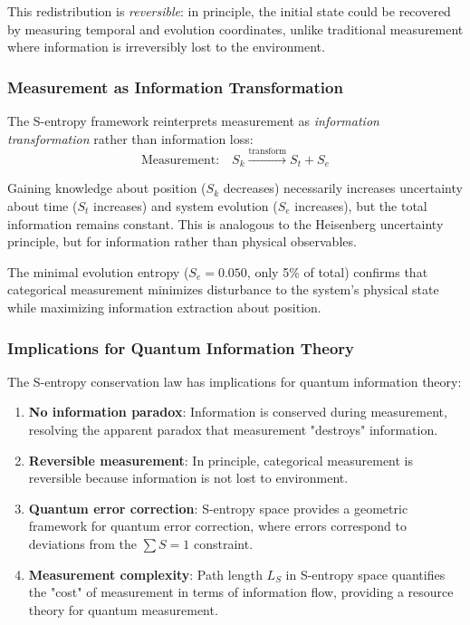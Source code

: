 \documentclass[twocolumn,10pt]{article}
\begin{document}
This redistribution is \textit{reversible}: in principle, the initial state 
could be recovered by measuring temporal and evolution coordinates, unlike 
traditional measurement where information is irreversibly lost to the environment.

\subsubsection{Measurement as Information Transformation}

The S-entropy framework reinterprets measurement as \textit{information transformation} 
rather than information loss:
%
\begin{equation}
\text{Measurement:} \quad S_k \xrightarrow{\text{transform}} S_t + S_e
\label{eq:info_transform}
\end{equation}

Gaining knowledge about position ($S_k$ decreases) necessarily increases 
uncertainty about time ($S_t$ increases) and system evolution ($S_e$ increases), 
but the total information remains constant. This is analogous to the Heisenberg 
uncertainty principle, but for information rather than physical observables.

The minimal evolution entropy ($S_e = 0.050$, only 5\% of total) confirms that 
categorical measurement minimizes disturbance to the system's physical state 
while maximizing information extraction about position.

\subsubsection{Implications for Quantum Information Theory}

The S-entropy conservation law has implications for quantum information theory:
%
\begin{enumerate}
\item \textbf{No information paradox}: Information is conserved during measurement, 
resolving the apparent paradox that measurement "destroys" information.

\item \textbf{Reversible measurement}: In principle, categorical measurement is 
reversible because information is not lost to environment.

\item \textbf{Quantum error correction}: S-entropy space provides a geometric 
framework for quantum error correction, where errors correspond to deviations 
from the $\sum S = 1$ constraint.

\item \textbf{Measurement complexity}: Path length $L_S$ in S-entropy space 
quantifies the "cost" of measurement in terms of information flow, providing a 
resource theory for quantum measurement.
\end{enumerate}
\end{document}
